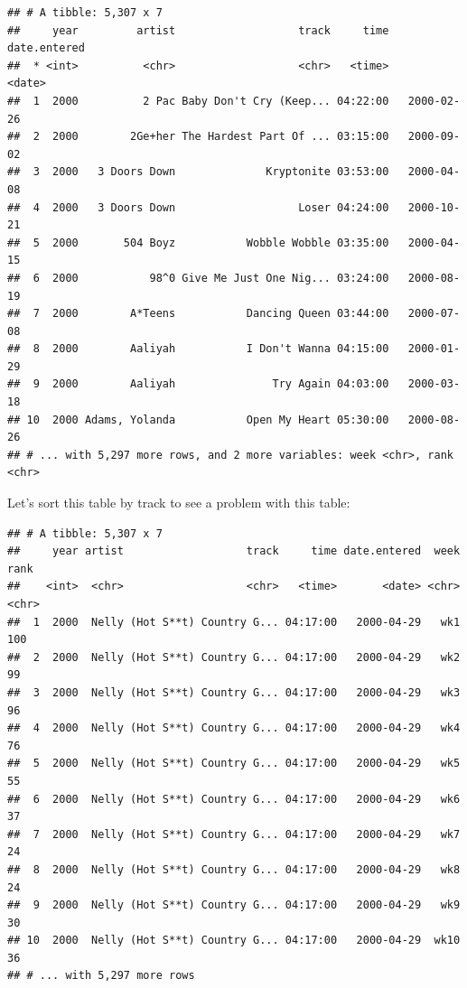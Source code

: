 \documentclass[]{book}
\newenvironment{Shaded}{\begin{snugshade}}{\end{snugshade}}
\newcommand{\KeywordTok}[1]{\textcolor[rgb]{0.13,0.29,0.53}{\textbf{#1}}}
\newcommand{\StringTok}[1]{\textcolor[rgb]{0.31,0.60,0.02}{#1}}
\newcommand{\OperatorTok}[1]{\textcolor[rgb]{0.81,0.36,0.00}{\textbf{#1}}}
\newcommand{\NormalTok}[1]{#1}
\theoremstyle{definition}
\theoremstyle{definition}
\theoremstyle{remark}
\begin{document}
\begin{verbatim}
## # A tibble: 5,307 x 7
##     year         artist                   track     time date.entered
##  * <int>          <chr>                   <chr>   <time>       <date>
##  1  2000          2 Pac Baby Don't Cry (Keep... 04:22:00   2000-02-26
##  2  2000        2Ge+her The Hardest Part Of ... 03:15:00   2000-09-02
##  3  2000   3 Doors Down              Kryptonite 03:53:00   2000-04-08
##  4  2000   3 Doors Down                   Loser 04:24:00   2000-10-21
##  5  2000       504 Boyz           Wobble Wobble 03:35:00   2000-04-15
##  6  2000           98^0 Give Me Just One Nig... 03:24:00   2000-08-19
##  7  2000        A*Teens           Dancing Queen 03:44:00   2000-07-08
##  8  2000        Aaliyah           I Don't Wanna 04:15:00   2000-01-29
##  9  2000        Aaliyah               Try Again 04:03:00   2000-03-18
## 10  2000 Adams, Yolanda           Open My Heart 05:30:00   2000-08-26
## # ... with 5,297 more rows, and 2 more variables: week <chr>, rank <chr>
\end{verbatim}

Let's sort this table by track to see a problem with this table:

\begin{Shaded}
\end{Shaded}

\begin{verbatim}
## # A tibble: 5,307 x 7
##     year artist                   track     time date.entered  week  rank
##    <int>  <chr>                   <chr>   <time>       <date> <chr> <chr>
##  1  2000  Nelly (Hot S**t) Country G... 04:17:00   2000-04-29   wk1   100
##  2  2000  Nelly (Hot S**t) Country G... 04:17:00   2000-04-29   wk2    99
##  3  2000  Nelly (Hot S**t) Country G... 04:17:00   2000-04-29   wk3    96
##  4  2000  Nelly (Hot S**t) Country G... 04:17:00   2000-04-29   wk4    76
##  5  2000  Nelly (Hot S**t) Country G... 04:17:00   2000-04-29   wk5    55
##  6  2000  Nelly (Hot S**t) Country G... 04:17:00   2000-04-29   wk6    37
##  7  2000  Nelly (Hot S**t) Country G... 04:17:00   2000-04-29   wk7    24
##  8  2000  Nelly (Hot S**t) Country G... 04:17:00   2000-04-29   wk8    24
##  9  2000  Nelly (Hot S**t) Country G... 04:17:00   2000-04-29   wk9    30
## 10  2000  Nelly (Hot S**t) Country G... 04:17:00   2000-04-29  wk10    36
## # ... with 5,297 more rows
\end{verbatim}
\end{document}
